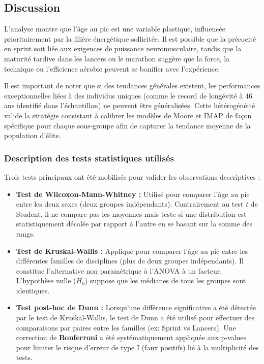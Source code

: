 \documentclass[
  french,
  11pt,
  a4paper,
]{article}
\providecommand{\tightlist}{%
  \setlength{\itemsep}{0pt}\setlength{\parskip}{0pt}}
\begin{document}
\subsection*{Discussion}\label{discussion}

L'analyse montre que l'âge au pic est une variable plastique, influencée
prioritairement par la filière énergétique sollicitée. Il est possible
que la précocité en sprint soit liée aux exigences de puissance
neuromusculaire, tandis que la maturité tardive dans les lancers ou le
marathon suggère que la force, la technique ou l'efficience aérobie
peuvent se bonifier avec l'expérience.

Il est important de noter que si des tendances générales existent, les
performances exceptionnelles liées à des individus uniques (comme le
record de longévité à 46 ans identifié dans l'échantillon) ne peuvent
être généralisées. Cette hétérogénéité valide la stratégie consistant à
calibrer les modèles de Moore et IMAP de façon spécifique pour chaque
sous-groupe afin de capturer la tendance moyenne de la population
d'élite.

\newpage

\subsubsection{Description des tests statistiques
utilisés}\label{description-des-tests-statistiques-utilisuxe9s}

Trois tests principaux ont été mobilisés pour valider les observations
descriptives :

\begin{itemize}
\tightlist
\item
  \textbf{Test de Wilcoxon-Mann-Whitney :} Utilisé pour comparer l'âge
  au pic entre les deux sexes (deux groupes indépendants). Contrairement
  au test \(t\) de Student, il ne compare pas les moyennes mais teste si
  une distribution est statistiquement décalée par rapport à l'autre en
  se basant sur la somme des rangs.
\item
  \textbf{Test de Kruskal-Wallis :} Appliqué pour comparer l'âge au pic
  entre les différentes familles de disciplines (plus de deux groupes
  indépendants). Il constitue l'alternative non paramétrique à l'ANOVA à
  un facteur. L'hypothèse nulle (\(H_0\)) suppose que les médianes de
  tous les groupes sont identiques.
\item
  \textbf{Test post-hoc de Dunn :} Lorsqu'une différence significative a
  été détectée par le test de Kruskal-Wallis, le test de Dunn a été
  utilisé pour effectuer des comparaisons par paires entre les familles
  (ex: Sprint vs Lancers). Une correction de \textbf{Bonferroni} a été
  systématiquement appliquée aux p-values pour limiter le risque
  d'erreur de type I (faux positifs) lié à la multiplicité des tests.
\end{itemize}
\end{document}
